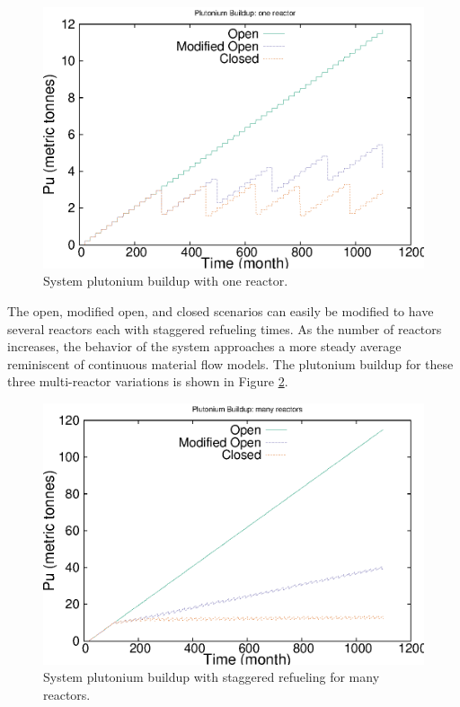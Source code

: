 \begin{figure}[H]
\label{fig:puseries1}
\caption{System plutonium buildup with one reactor.}
\begin{center}
\includegraphics{./images/puseries-1.eps}
\end{center}
\end{figure}

The open, modified open, and closed scenarios can easily be modified to have
several reactors each with staggered refueling times.  As the number of
reactors increases, the behavior of the system approaches a more steady
average reminiscent of continuous material flow models.  The plutonium buildup
for these three multi-reactor variations is shown in Figure
\ref{fig:puseriesn}.

\begin{figure}[H]
\label{fig:puseriesn}
\caption{System plutonium buildup with staggered refueling for many reactors.}
\begin{center}
\includegraphics{./images/puseries-n.eps}
\end{center}
\end{figure}

